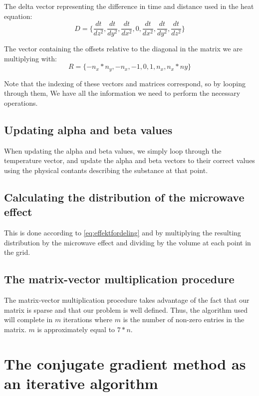 The delta vector representing the difference in time and distance used in the heat
equation:
\begin{equation}
D = \{ \frac{dt}{dz^2}, \frac{dt}{dy^2}, \frac{dt}{dx^2}, 0, \frac{dt}{dx^2}, \frac{dt}{dy^2}, \frac{dt}{dz^2} \}
\end{equation}

The vector containing the offsets relative to the diagonal in the matrix we are multiplying
with:
\begin{equation}
R = \{ -n_x*n_y, -n_x, -1, 0, 1, n_x, n_x*ny \}
\end{equation}

Note that the indexing of these vectors and matrices correspond, so by looping through them,
We have all the information we need to perform the necessary operations.

\subsection{Updating alpha and beta values}

When updating the alpha and beta values, we simply loop through the temperature
vector, and update the alpha and beta vectors to their correct values using the
physical contants describing the substance at that point.

\subsection{Calculating the distribution of the microwave effect}

This is done according to \cref{eq:effektfordeling} and by multiplying the
resulting distribution by the microwave effect and dividing by the volume at each point
in the grid.

\subsection{The matrix-vector multiplication procedure}

The matrix-vector multiplication procedure takes advantage of the fact that our 
matrix is sparse and that our problem is well defined. Thus, the algorithm used
will complete in $m$ iterations where $m$ is the number of non-zero entries in 
the matrix. $m$ is approximately equal to $7*n$.

\section{The conjugate gradient method as an iterative algorithm}

